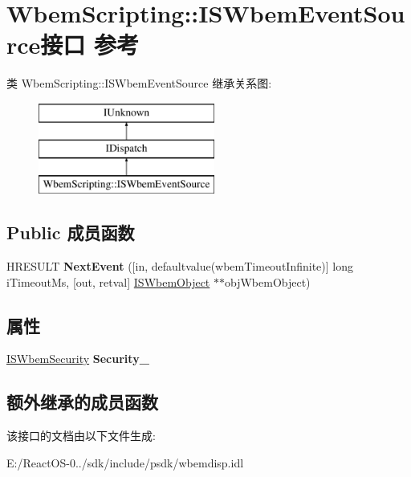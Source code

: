 \hypertarget{interface_wbem_scripting_1_1_i_s_wbem_event_source}{}\section{Wbem\+Scripting\+:\+:I\+S\+Wbem\+Event\+Source接口 参考}
\label{interface_wbem_scripting_1_1_i_s_wbem_event_source}
类 Wbem\+Scripting\+:\+:I\+S\+Wbem\+Event\+Source 继承关系图\+:\begin{figure}[H]
\begin{center}
\leavevmode
\includegraphics[height=3.000000cm]{interface_wbem_scripting_1_1_i_s_wbem_event_source}
\end{center}
\end{figure}
\subsection*{Public 成员函数}
\begin{DoxyCompactItemize}
\item 
\mbox{\label{interface_wbem_scripting_1_1_i_s_wbem_event_source_ab398132a3d2a4a4746c007570d6e1896}} 
H\+R\+E\+S\+U\+LT {\bfseries Next\+Event} (\mbox{[}in, defaultvalue(wbem\+Timeout\+Infinite)\mbox{]} long i\+Timeout\+Ms, \mbox{[}out, retval\mbox{]} \hyperlink{interface_wbem_scripting_1_1_i_s_wbem_object}{I\+S\+Wbem\+Object} $\ast$$\ast$obj\+Wbem\+Object)
\end{DoxyCompactItemize}
\subsection*{属性}
\begin{DoxyCompactItemize}
\item 
\mbox{\label{interface_wbem_scripting_1_1_i_s_wbem_event_source_a287892c8b872f1989f36526c89aec0e8}} 
\hyperlink{interface_wbem_scripting_1_1_i_s_wbem_security}{I\+S\+Wbem\+Security} {\bfseries Security\+\_\+}
\end{DoxyCompactItemize}
\subsection*{额外继承的成员函数}


该接口的文档由以下文件生成\+:\begin{DoxyCompactItemize}
\item 
E\+:/\+React\+O\+S-\/0../sdk/include/psdk/wbemdisp.\+idl\end{DoxyCompactItemize}
